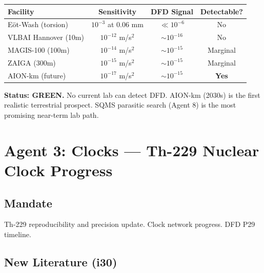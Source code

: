 \documentclass[11pt,a4paper]{article}
\newcommand{\GREEN}{\textcolor{dfdgreen}{\textbf{GREEN}}}
\begin{document}
\begin{center}
\begin{tabular}{lccc}
\toprule
\textbf{Facility} & \textbf{Sensitivity} & \textbf{DFD Signal} & \textbf{Detectable?} \\
\midrule
E\"ot-Wash (torsion) & $10^{-3}$ at 0.06 mm & $\ll 10^{-6}$ & No \\
VLBAI Hannover (10m) & $10^{-12}$ m/s$^2$ & $\sim 10^{-16}$ & No \\
MAGIS-100 (100m) & $10^{-14}$ m/s$^2$ & $\sim 10^{-15}$ & Marginal \\
ZAIGA (300m) & $10^{-15}$ m/s$^2$ & $\sim 10^{-15}$ & Marginal \\
AION-km (future) & $10^{-17}$ m/s$^2$ & $\sim 10^{-15}$ & \textbf{Yes} \\
\bottomrule
\end{tabular}
\end{center}

\textbf{Status: \GREEN.} No current lab can detect DFD. AION-km (2030s) is the first realistic terrestrial prospect. SQMS parasitic search (Agent 8) is the most promising near-term lab path.

\section{Agent 3: Clocks --- Th-229 Nuclear Clock Progress}

\subsection{Mandate}
Th-229 reproducibility and precision update. Clock network progress. DFD P29 timeline.

\subsection{New Literature (i30)}
\end{document}
